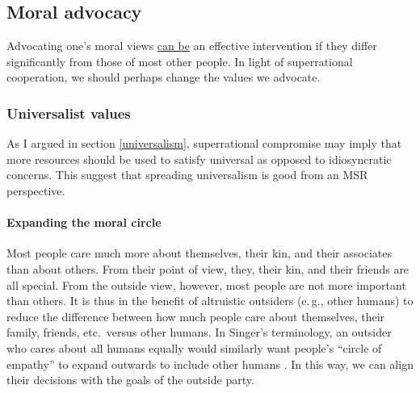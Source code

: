 \hypertarget{moral-advocacy}{\subsection{Moral
advocacy}\label{moral-advocacy}}

Advocating one's moral views
\href{http://www.utilitarian-essays.com/values-spreading.html}{can
be} an effective intervention if they differ significantly from those
of most other people. In light of superrational cooperation, we should
perhaps change the values we advocate.

\hypertarget{universalist-values}{\subsubsection{Universalist
values}\label{universalist-values}}

As I argued in section
\ref{universalism},
superrational compromise may imply that more resources
should be used to satisfy universal as opposed to idiosyncratic concerns. This
suggest that spreading universalism is good from an MSR perspective.

\paragraph{Expanding the moral circle}\label{expanding-the-moral-circle}

Most people care much more about themselves, their kin, and their
associates than about others. From their point of view, they, their
kin, and their friends are all special. From the outside view, however,
most people are not more important than others. It is thus in the
benefit of altruistic outsiders (e.\,g., other humans) to reduce the
difference between how much people care about themselves, their family,
friends, etc.\ versus other humans. In Singer's
terminology, an outsider who cares
about all humans equally would similarly want people's ``circle of
empathy'' to expand outwards to include other humans \parencite{Singer2011-yx}. In this way, we
can align their decisions with the goals of the outside party.

